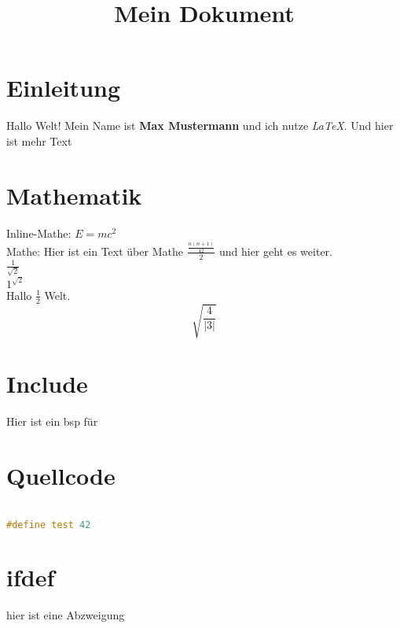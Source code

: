 \documentclass{article}
\title{Mein Dokument}
\author{}
\begin{document}
\maketitle

\section{Einleitung}
Hallo Welt! 
Mein Name ist \textbf{Max Mustermann} und ich nutze \textit{LaTeX}.
Und hier ist mehr Text

\section{Mathematik}
Inline-Mathe: $E = mc^2$  \\
Mathe: Hier ist ein Text über Mathe \(\frac{\frac{n(n+1)}{ 42}}{ 2}\) und hier geht es weiter.\\  

\(\frac{1}{ \sqrt{2}}\) \\

\({1}^{ \sqrt{2}}\) \\

Hallo \(\frac{1}{ 2}\) Welt.  
\[\sqrt{\frac{4}{ \left|3\right|}}\]

\section{Include}
Hier ist ein bsp für 

\section{Quellcode}

\begin{lstlisting}[language=c++]

#define test 42

\end{lstlisting}


\section{ifdef}
hier ist eine Abzweigung
\end{document}
